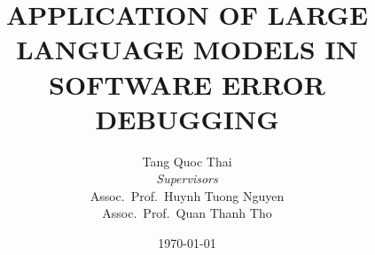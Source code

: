\usepackage[english]{babel}

\title[Master Thesis]{
    APPLICATION OF LARGE LANGUAGE MODELS IN SOFTWARE ERROR DEBUGGING
}

\author[Tang Quoc Thai]{
Tang Quoc Thai\\[4mm]
{\small \textit{Supervisors} \\[1mm]
Assoc.\ Prof.\ Huynh Tuong Nguyen \\[1mm]
Assoc.\ Prof.\ Quan Thanh Tho}}


\date{\today}
